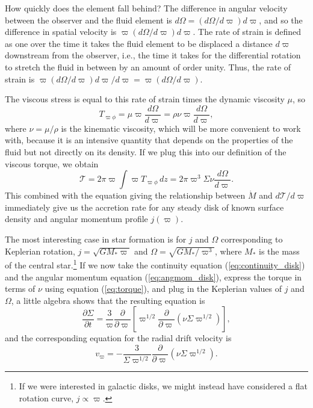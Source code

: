 How quickly does the element fall behind? The difference in angular velocity between the observer and the fluid element is $d\Omega = (d\Omega/d\varpi) d\varpi$, and so the difference in spatial velocity is $\varpi (d\Omega/d\varpi) d\varpi$. The rate of strain is defined as one over the time it takes the fluid element to be displaced a distance $d\varpi$ downstream from the observer, i.e., the time it takes for the differential rotation to stretch the fluid in between by an amount of order unity. Thus, the rate of strain is $\varpi (d\Omega/d\varpi) d\varpi/d\varpi = \varpi (d\Omega/d\varpi)$.

The viscous stress is equal to this rate of strain times the dynamic viscosity $\mu$, so
\begin{equation}
T_{\varpi\phi} = \mu \varpi \frac{d\Omega}{d\varpi} = \rho \nu \varpi \frac{d\Omega}{d\varpi},
\end{equation}
where $\nu=\mu/\rho$ is the kinematic viscosity, which will be more convenient to work with, because it is an intensive quantity that depends on the properties of the fluid but not directly on its density. If we plug this into our definition of the viscous torque, we obtain
\begin{equation}
\label{eq:torque}
\mathcal{T} = 2\pi \varpi \int \varpi T_{\varpi\phi}\, dz = 2\pi \varpi^3 \Sigma \nu \frac{d\Omega}{d\varpi}.
\end{equation}
This combined with the equation giving the relationship between $\dot{M}$ and $d\mathcal{T}/d\varpi$ immediately give us the accretion rate for any steady disk of known surface density and angular momentum profile $j(\varpi)$.

The most interesting case in star formation is for $j$ and $\Omega$ corresponding to Keplerian rotation, $j=\sqrt{GM_*\varpi}$ and $\Omega=\sqrt{GM_*/\varpi^3}$, where $M_*$ is the mass of the central star.\footnote{If we were interested in galactic disks, we might instead have considered a flat rotation curve, $j\propto \varpi$.} If we now take the continuity equation (\ref{eq:continuity_disk}) and the angular momentum equation (\ref{eq:angmom_disk}), express the torque in terms of $\nu$ using equation (\ref{eq:torque}), and plug in the Keplerian values of $j$ and $\Omega$, a little algebra shows that the resulting equation is
\begin{equation}
\label{eq:disk_keplerian}
\frac{\partial \Sigma}{\partial t} = \frac{3}{\varpi} \frac{\partial}{\partial \varpi} \left[\varpi^{1/2} \frac{\partial}{\partial \varpi}\left(\nu \Sigma \varpi^{1/2}\right)\right],
\end{equation}
and the corresponding equation for the radial drift velocity is
\begin{equation}
v_\varpi = -\frac{3}{\Sigma \varpi^{1/2}} \frac{\partial}{\partial \varpi}(\nu \Sigma \varpi^{1/2}).
\end{equation}

